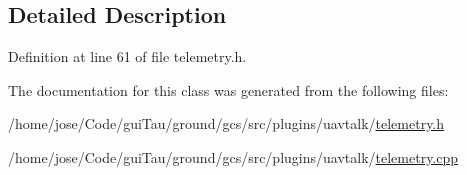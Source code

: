 \subsection{Detailed Description}


Definition at line 61 of file telemetry.\-h.



The documentation for this class was generated from the following files\-:\begin{DoxyCompactItemize}
\item 
/home/jose/\-Code/gui\-Tau/ground/gcs/src/plugins/uavtalk/\hyperlink{telemetry_8h}{telemetry.\-h}\item 
/home/jose/\-Code/gui\-Tau/ground/gcs/src/plugins/uavtalk/\hyperlink{telemetry_8cpp}{telemetry.\-cpp}\end{DoxyCompactItemize}
